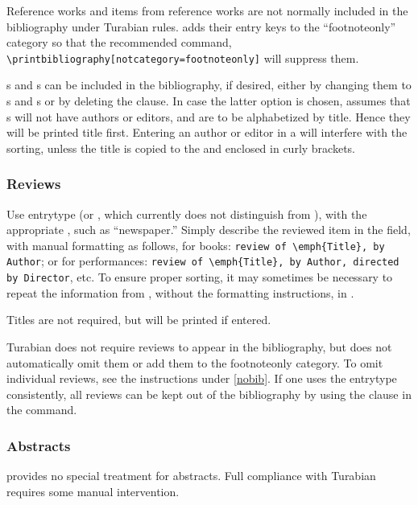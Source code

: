 \documentclass{ltxdockit}[2010/02/12]
\begin{document}
Reference works and items from reference works are not normally included in the bibliography under Turabian rules.  adds their entry keys to the ``footnoteonly'' category so that the recommended  command, \verb|\printbibliography[notcategory=footnoteonly]| will suppress them. 

s and s can be included in the bibliography, if desired, either by changing them to s and s or by deleting the  clause. In case the latter option is chosen,  assumes that s will not have authors or editors, and are to be alphabetized by title. Hence they will be printed title first. Entering an author or editor in a   will interfere with the sorting, unless the title is copied to the  and enclosed in curly brackets.\autocites[][]{adelung1793grammatisch-kri}



\subsubsection{Reviews}
Use entrytype  (or , which  currently does not distinguish from ), with the appropriate , such as ``newspaper.'' Simply describe the reviewed item in the  field, with manual formatting as follows, for books:
\verb|review of \emph{Title}, by Author|; or for performances: 
\verb|review of \emph{Title}, by Author, directed by Director|, etc.
To ensure proper sorting, it may sometimes be necessary to repeat the information from , without the formatting instructions, in .

Titles are not required,\autocites[][]{bronn186015} but will be printed if entered.\autocites[][]{waddington1971individual-para}

Turabian does not require reviews to appear in the bibliography, but  does not automatically omit them or add them to the footnoteonly category. To omit individual reviews, see the instructions under \ref{nobib}. If one uses the entrytype  consistently, all reviews can be kept out of the bibliography by using the clause  in the  command.

\subsubsection{Abstracts}
 provides no special treatment for abstracts. Full compliance with Turabian requires some manual intervention. 
\end{document}
